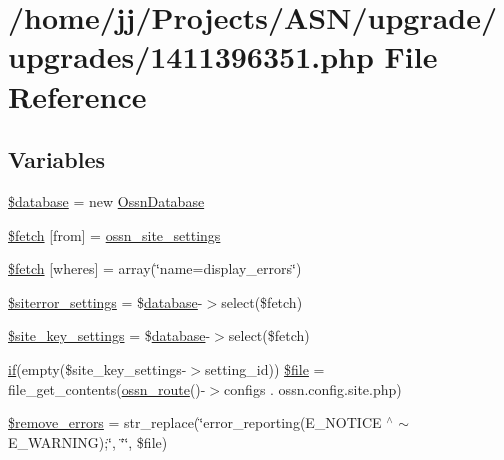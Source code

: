 \hypertarget{1411396351_8php}{}\section{/home/jj/\+Projects/\+A\+S\+N/upgrade/upgrades/1411396351.php File Reference}
\label{1411396351_8php}
\subsection*{Variables}
\begin{DoxyCompactItemize}
\item 
\hyperlink{1411396351_8php_a7691c0162d89de0b6ba47edcd8ba8878}{\$database} = new \hyperlink{class_ossn_database}{Ossn\+Database}
\item 
\hyperlink{1411396351_8php_ae91bffdbb4c66207cfd927d922ef63e7}{\$fetch} \mbox{[}\textquotesingle{}from\textquotesingle{}\mbox{]} = \textquotesingle{}\hyperlink{ossn_8lib_8system_8php_a610e2045b8a86c09f777b4d82e24e34c}{ossn\+\_\+site\+\_\+settings}\textquotesingle{}
\item 
\hyperlink{1411396351_8php_ac72c925d8ad9ab6b9bf7c7a1401230bb}{\$fetch} \mbox{[}\textquotesingle{}wheres\textquotesingle{}\mbox{]} = array(\char`\"{}name=\textquotesingle{}display\+\_\+errors\textquotesingle{}\char`\"{})
\item 
\hyperlink{1411396351_8php_a603ec11d3d0b1de98b918ac7beaed8e9}{\$siterror\+\_\+settings} = \$\hyperlink{ossn_8config_8db_8example_8php_a4e0ca996705612048240f76ff8d4da95}{database}-\/$>$select(\$fetch)
\item 
\hyperlink{1411396351_8php_ae846833ac05b1013eb18688f385be0f6}{\$site\+\_\+key\+\_\+settings} = \$\hyperlink{ossn_8config_8db_8example_8php_a4e0ca996705612048240f76ff8d4da95}{database}-\/$>$select(\$fetch)
\item 
\hyperlink{jquery_8tokeninput_8js_ad8dd46a3cbc004569e34401e9e71771a}{if}(empty(\$site\+\_\+key\+\_\+settings-\/$>$setting\+\_\+id)) \hyperlink{1411396351_8php_a26b660feab4650f67453790d8da963ce}{\$file} = file\+\_\+get\+\_\+contents(\hyperlink{ossn_8lib_8route_8php_ac23dc424aa33dcd57982b72f4ed1217e}{ossn\+\_\+route}()-\/$>$configs . \textquotesingle{}ossn.\+config.\+site.\+php\textquotesingle{})
\item 
\hyperlink{1411396351_8php_a7c532aa81eeffa35b8c2bb5c7648c85a}{\$remove\+\_\+errors} = str\+\_\+replace(\char`\"{}error\+\_\+reporting(E\+\_\+\+N\+O\+T\+I\+CE $^\wedge$ $\sim$E\+\_\+\+W\+A\+R\+N\+I\+NG);\char`\"{}, \char`\"{}\char`\"{}, \$file)

\end{DoxyCompactItemize}
